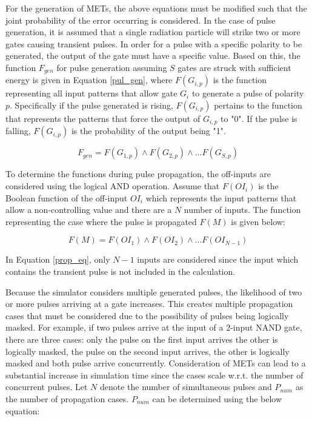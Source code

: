\documentclass[conference]{IEEEtran}
\begin{document}
For the generation of METs, the above equations must be modified such that the joint probability of the error occurring is considered. In the case of pulse generation, it is assumed that a single radiation particle will strike two or more gates causing transient pulses. In order for a pulse with a specific polarity to be generated, the output of the gate must have a specific value. Based on this, the function $F_{gen}$ for pulse generation assuming $S$ gates are struck with sufficient energy is given in Equation \ref{pul_gen}, where $F(G_{i,p})$ is the function representing all input patterns that allow gate $G_i$ to generate a pulse of polarity $p$. Specifically if the pulse generated is rising, $F(G_{i,p})$ pertains to the function that represents the patterns that force the output of $G_{i,p}$ to "0". If the pulse is falling, $F(G_{i,p})$ is the probability of the output being "1".

\small
\begin{equation} \label{pul_gen}
F_{gen} = F(G_{1, p}) \land F(G_{2, p}) \land ... F(G_{S, p})
\end{equation}
\normalsize

To determine the functions during pulse propagation, the off-inputs are considered using the logical AND operation. Assume that $F(OI_i)$ is the Boolean function of the off-input $OI_i$ which represents the input patterns that allow a non-controlling value and there are a $N$ number of inputs. The function representing the case where the pulse is propagated $F(M)$ is given below:

\small
\begin{equation} \label{prop_eq}
F(M) = F(OI_1) \land F(OI_2) \land ... F(OI_{N-1})
\end{equation}
\normalsize

In Equation \ref{prop_eq}, only $N-1$ inputs are considered since the input which contains the transient pulse is not included in the calculation. 

Because the simulator considers multiple generated pulses, the likelihood of two or more pulses arriving at a gate increases. This creates multiple propagation cases that must be considered due to the possibility of pulses being logically masked. For example, if two pulses arrive at the input of a 2-input NAND gate, there are three cases: only the pulse on the first input arrives the other is logically masked, the pulse on the second input arrives, the other is logically masked and both pulse arrive concurrently. Consideration of METs can lead to a substantial increase in simulation time since the cases scale w.r.t. the number of concurrent pulses. Let $N$ denote the number of simultaneous pulses and $P_{num}$ as the number of propagation cases. $P_{num}$ can be determined using the below equation:
\end{document}
